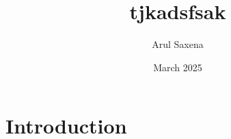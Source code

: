 \documentclass{article}
\title{tjkadsfsak}
\author{Arul Saxena}
\date{March 2025}
\begin{document}
\maketitle

\section{Introduction}
\end{document}

